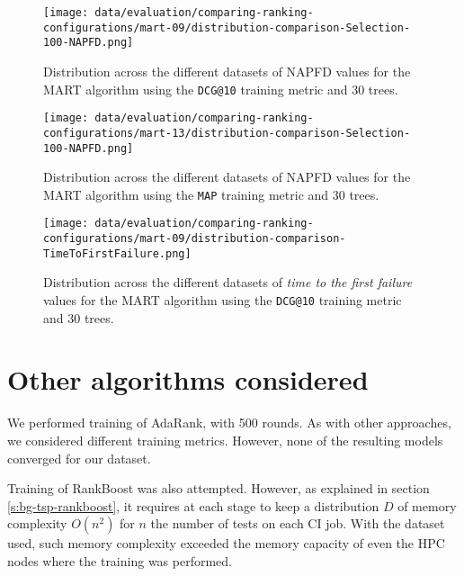\begin{figure}
    \centering
    \begin{minipage}{.45\textwidth}
        \centering
        \texttt{[image: data/evaluation/comparing-ranking-configurations/mart-09/distribution-comparison-Selection-100-NAPFD.png]}
        \parbox{0.9\textwidth}{
            \caption{Distribution across the different datasets of NAPFD values for the MART algorithm using the \texttt{DCG@10} training metric and 30 trees.}
        \label{fig:mart-09-napfd}
            }
    \end{minipage}%
    \begin{minipage}{.45\textwidth}
        \centering
        \texttt{[image: data/evaluation/comparing-ranking-configurations/mart-13/distribution-comparison-Selection-100-NAPFD.png]}
        \parbox{0.9\textwidth}{
            \caption{Distribution across the different datasets of NAPFD values for the MART algorithm using the \texttt{MAP} training metric and 30 trees.}
        \label{fig:mart-13-napfd}
            }
    \end{minipage}%
\end{figure}
\begin{figure}
    \centering
    \begin{minipage}{.45\textwidth}
        \centering
        \texttt{[image: data/evaluation/comparing-ranking-configurations/mart-09/distribution-comparison-TimeToFirstFailure.png]}
        \parbox{0.9\textwidth}{
            \caption{Distribution across the different datasets of \emph{time to the first failure} values for the MART algorithm using the \texttt{DCG@10} training metric and 30 trees.}
        \label{fig:mart-09-tff}
            }
    \end{minipage}%
\end{figure}

\section{Other algorithms considered}

We performed training of AdaRank, with 500 rounds. As with other approaches, we considered different training metrics. 
However, none of the resulting models converged for our dataset.

Training of RankBoost was also attempted. However, as explained in section \ref{s:bg-tsp-rankboost},
it requires at each stage to keep a distribution $D$ of memory complexity $O(n^2)$ for $n$ the number of tests
on each CI job. With the dataset used, such memory complexity exceeded the memory capacity of even the HPC nodes 
where the training was performed.